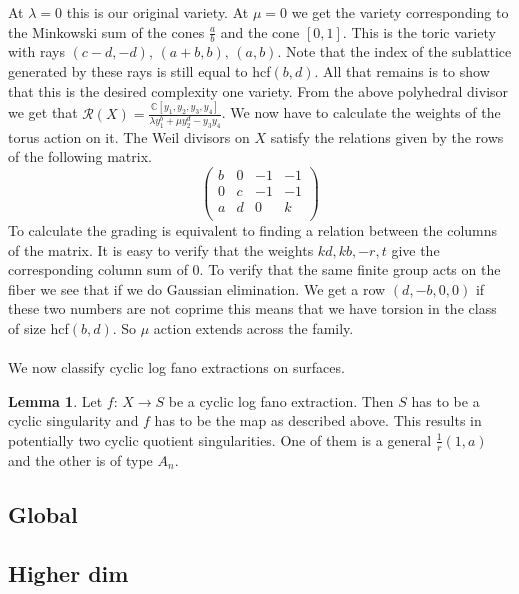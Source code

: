 \documentclass[11pt]{amsart}
\theoremstyle{definition}
\theoremstyle{definition}
\theoremstyle{definition}
\theoremstyle{definition}
\theoremstyle{definition}
\newtheorem{lem}[thm]{Lemma}
\theoremstyle{definition}
\theoremstyle{definition}
\theoremstyle{definition}
\begin{document}
At $\lambda = 0$ this is our original variety. At $\mu = 0$ we get the variety corresponding to the Minkowski sum of the cones $\frac{a}{b}$ and the cone $\left[ 0, 1 \right]$. This is the toric variety with rays $(c-d,-d), \, (a+b, b), \, (a,b)$. Note that the index of the sublattice generated by these rays is still equal to hcf$(b, d)$. All that remains is to show that this is the desired complexity one variety. From the above polyhedral divisor we get that $\mathcal{R}(X) =\frac{\mathbb{C}[y_1, y_2, y_3,  y_4]}{\lambda y_1^b  + \mu y_2^d - y_3 y_4}$. We now have to calculate the weights of the torus action on it. The Weil divisors on $X$ satisfy the relations given by the rows of the following matrix. 
\[
 \left(
 \begin{array}{cccc}
b & 0 & -1 & -1  \\
0 & c & -1 & -1 \\
a & d & 0  & k \\
\end{array}
\right) 
\]
To calculate the grading is equivalent to finding a relation between the columns of the matrix. It is easy to verify that the weights $kd,kb,-r,t$ give the corresponding column sum of 0. To verify that the same finite group acts on the fiber we see that if we do Gaussian elimination. We get a row $(d, -b, 0 ,0)$ if these two numbers are not coprime this means that we have torsion in the class of size hcf$(b,d)$. So $\mathbb{\mu}$ action extends across the family. 
\\
\\
We now classify cyclic log fano extractions on surfaces.
\begin{lem}
Let $f: \, X \rightarrow S$ be a cyclic log fano extraction. Then $S$ has to be a cyclic singularity and $f$ has to be the map as described above. This results in potentially two cyclic quotient singularities. One of them is a general $\frac{1}{r} (1, a)$ and the other is of type $A_n$.
\end{lem}

\subsection{Global}
\subsection{Higher dim}
\end{document}

